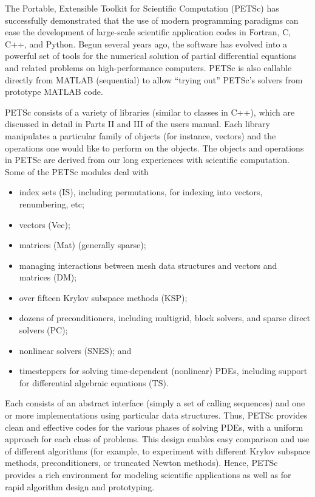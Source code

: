 
%
%
%

\label{sec_gettingstarted}

The Portable, Extensible Toolkit for Scientific Computation (PETSc)
has successfully demonstrated that the use of modern programming
paradigms can ease the development of large-scale scientific
application codes in Fortran, C, C++, and Python.  Begun several years ago,
the software has evolved into a powerful set of tools for the
numerical solution of partial differential equations and related problems
on high-performance computers. PETSc is also callable directly from MATLAB (sequential) to
allow ``trying out'' PETSc's solvers from prototype MATLAB code.

PETSc consists of a variety of libraries (similar to classes in C++),
which are discussed in detail in Parts II and III of the users manual.
Each library manipulates a particular family of objects (for instance,
vectors) and the operations one would like to perform on the objects.
The objects and operations in PETSc are derived from our long
experiences with scientific computation. Some of the PETSc modules deal with
\begin{itemize}
\item index sets (IS), including permutations, for indexing into vectors, renumbering, etc;
\item vectors (Vec);
\item matrices (Mat) (generally sparse);
\item managing interactions between mesh data structures and vectors and matrices (DM);
\item over fifteen Krylov subspace methods (KSP);
\item dozens of preconditioners, including multigrid, block solvers, and sparse direct solvers (PC);
\item nonlinear solvers (SNES); and
\item timesteppers for solving time-dependent (nonlinear) PDEs, including support for differential algebraic equations (TS).
\end{itemize}
Each consists of an abstract interface
(simply a set of calling sequences) and one or more implementations
using particular data structures. Thus, PETSc provides clean and
effective codes for the various phases of solving PDEs, with a uniform
approach for each class of problems.  This design
enables easy comparison and use of different algorithms (for example,
to experiment with different Krylov subspace methods, preconditioners,
or truncated Newton methods).
Hence, PETSc provides a rich environment for modeling scientific
applications as well as for rapid algorithm design and prototyping.

